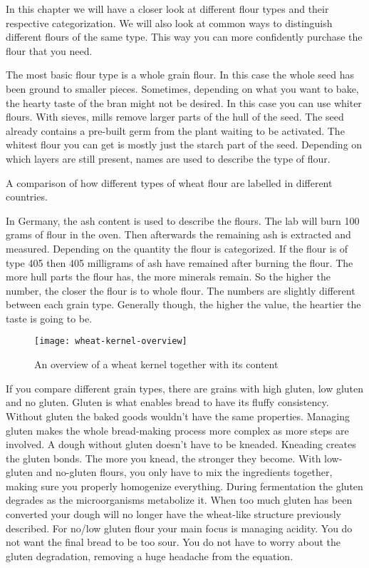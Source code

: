 In this chapter we will have a closer look at different flour types
and their respective categorization. We will also look at common
ways to distinguish different flours of the same type. This way you can more confidently
purchase the flour that you need.

The most basic flour type is a whole grain flour. In this case the whole seed has
been ground to smaller pieces. Sometimes, depending on what you want to bake,
the hearty taste of the bran might not be desired. In this case you can use
whiter flours. With sieves, mills remove larger parts of the hull of the seed.
The seed already contains a pre-built germ from the plant waiting to be
activated. The whitest flour you can get is mostly just the starch part of the seed.
Depending on which layers are still present, names are used to describe the
type of flour.

\begin{table}[!htb]
    \begin{center}
        
        \label{tab:flour-types-comparison}
        \caption{A comparison of how different types of wheat flour are
        labelled in different countries.}
    \end{center}
\end{table}

In Germany, the ash content is used to describe the flours. The lab will burn
100 grams of flour in the oven. Then afterwards the remaining ash is extracted
and measured. Depending on the quantity the flour is categorized. If the flour
is of type 405 then 405 milligrams of ash have remained after burning the
flour. The more hull parts the flour has, the more minerals remain. So the
higher the number, the closer the flour is to whole flour. The numbers are
slightly different between each grain type. Generally though, the higher the
value, the heartier the taste is going to be.

\begin{figure}[htb!]
  \texttt{[image: wheat-kernel-overview]}
  \caption{An overview of a wheat kernel together with its content~\cite{wheat+kernel}}
  \label{fig:wheat-kernel-overview}
\end{figure}

If you compare different grain types, there are grains with high gluten, low gluten
and no gluten. Gluten is what enables bread to have its fluffy consistency.
Without gluten the baked goods wouldn't have the same properties. Managing
gluten makes the whole bread-making process more complex as more steps are involved.
A dough without gluten doesn't have to be kneaded. Kneading creates
the gluten bonds. The more you knead, the stronger they become. With low-gluten
and no-gluten flours, you only have to mix the ingredients together, making
sure you properly homogenize everything. During fermentation
the gluten degrades as the microorganisms metabolize it. When too much gluten
has been converted your dough will no longer have the wheat-like structure previously
described. For no/low gluten flour your main focus is managing acidity. You do not
want the final bread to be too sour. You do not have to worry about the gluten
degradation, removing a huge headache from the equation.

